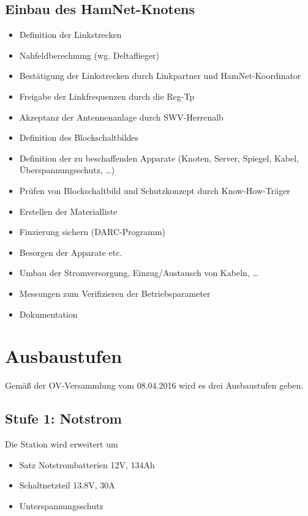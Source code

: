 \documentclass[a4paper]{scrartcl}
\begin{document}
\subsection{Einbau des HamNet-Knotens}
\begin{itemize}
    \item Definition der Linkstrecken
    \item Nahfeldberechnung (wg. Deltaflieger)
    \item Best\"atigung der Linkstrecken durch Linkpartner und HamNet-Koordinator
    \item Freigabe der Linkfrequenzen durch die Reg-Tp
    \item Akzeptanz der Antennenanlage durch SWV-Herrenalb
    \item Definition des Blockschaltbildes
    \item Definition der zu beschaffenden Apparate (Knoten, Server, Spiegel, Kabel, \"Uberspannungsschutz, \dots)
    \item Pr\"ufen von Blockschaltbild und Schutzkonzept durch Know-How-Tr\"ager
    \item Erstellen der Materialliste
    \item Finzierung sichern (DARC-Programm)
    \item Besorgen der Apparate etc.
    \item Umbau der Stromversorgung, Einzug/Austausch von Kabeln, \dots
    \item Messungen zum Verifizieren der Betriebsparameter
    \item Dokumentation
\end{itemize}


\section{Ausbaustufen}
Gem\"a\ss{} der OV-Versammlung vom 08.04.2016 wird es drei Ausbaustufen geben.

\subsection{Stufe 1: Notstrom}
Die Station wird erweitert um
\begin{itemize}
    \item Satz Notstrombatterien 12V, 134Ah
    \item Schaltnetzteil 13.8V, 30A
    \item Unterspannungsschutz
\end{itemize}
\end{document}
